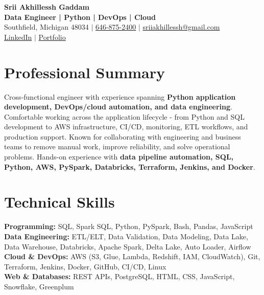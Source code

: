 \documentclass[letterpaper,10pt]{article}
\begin{document}
\fontsize{9.35pt}{10.45pt}\selectfont

\begin{center}
    {\LARGE \textbf{Srii Akhillessh Gaddam}} \\[-1pt]
    \textbf{Data Engineer | Python | DevOps | Cloud} \\[2pt]
    Southfield, Michigan 48034 $|$
    \href{tel:6468752400}{646-875-2400} $|$
    \href{mailto:sriiakhillessh@gmail.com}{sriiakhillessh@gmail.com} \\[1pt]
    \href{https://www.linkedin.com/in/srii-akhiilessh-gaddam-b48668191/}{LinkedIn} $|$
    \href{https://sriiakhillesshg.github.io/portfolio/}{Portfolio}
\end{center}
\vspace{-8pt}

\section{Professional Summary}
\small{Cross-functional engineer with experience spanning \textbf{Python application development, DevOps/cloud automation, and data engineering}. Comfortable working across the application lifecycle - from Python and SQL development to AWS infrastructure, CI/CD, monitoring, ETL workflows, and production support. Known for collaborating with engineering and business teams to remove manual work, improve reliability, and solve operational problems. Hands-on experience with \textbf{data pipeline automation, SQL, Python, AWS, PySpark, Databricks, Terraform, Jenkins, and Docker}.}

\section{Technical Skills}
\small{
\textbf{Programming:} SQL, Spark SQL, Python, PySpark, Bash, Pandas, JavaScript \\
\textbf{Data Engineering:} ETL/ELT, Data Validation, Data Modeling, Data Lake, Data Warehouse, Databricks, Apache Spark, Delta Lake, Auto Loader, Airflow \\
\textbf{Cloud \& DevOps:} AWS (S3, Glue, Lambda, Redshift, IAM, CloudWatch), Git, Terraform, Jenkins, Docker, GitHub, CI/CD, Linux \\
\textbf{Web \& Databases:} REST APIs, PostgreSQL, HTML, CSS, JavaScript, Snowflake, Greenplum
}
\end{document}
